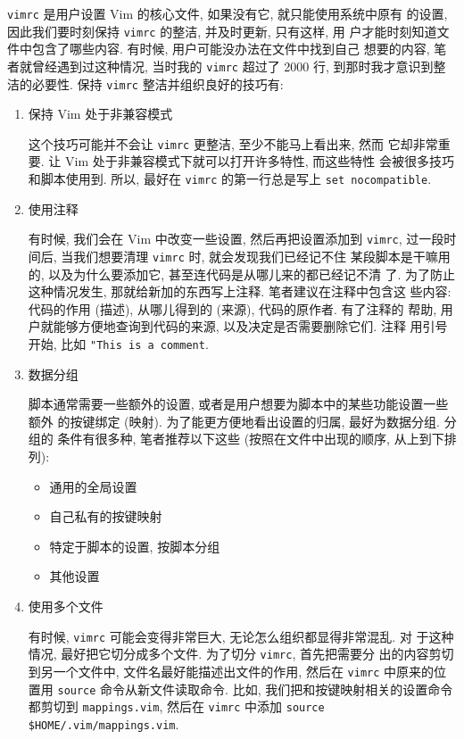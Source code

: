 \texttt{vimrc} 是用户设置 Vim 的核心文件, 如果没有它, 就只能使用系统中原有
的设置, 因此我们要时刻保持 \texttt{vimrc} 的整洁, 并及时更新, 只有这样, 用
户才能时刻知道文件中包含了哪些内容. 有时候, 用户可能没办法在文件中找到自己
想要的内容, 笔者就曾经遇到过这种情况, 当时我的 \texttt{vimrc} 超过了 2000 行,
到那时我才意识到整洁的必要性. 保持 \texttt{vimrc} 整洁并组织良好的技巧有:
\begin{enumerate}
	\item 保持 Vim 处于非兼容模式

	这个技巧可能并不会让 \texttt{vimrc} 更整洁, 至少不能马上看出来, 然而
	它却非常重要. 让 Vim 处于非兼容模式下就可以打开许多特性, 而这些特性
	会被很多技巧和脚本使用到. 所以, 最好在 \texttt{vimrc} 的第一行总是写上
	\texttt{set nocompatible}.
	
	\item 使用注释

	有时候, 我们会在 Vim 中改变一些设置, 然后再把设置添加到 \texttt{vimrc},
	过一段时间后, 当我们想要清理 \texttt{vimrc} 时, 就会发现我们已经记不住
	某段脚本是干嘛用的, 以及为什么要添加它, 甚至连代码是从哪儿来的都已经记不清
	了. 为了防止这种情况发生, 那就给新加的东西写上注释. 笔者建议在注释中包含这
	些内容: 代码的作用 (描述), 从哪儿得到的 (来源), 代码的原作者. 有了注释的
	帮助, 用户就能够方便地查询到代码的来源, 以及决定是否需要删除它们. 注释
	用引号开始, 比如 \texttt{"This is a comment}.

	\item 数据分组

	脚本通常需要一些额外的设置, 或者是用户想要为脚本中的某些功能设置一些额外
	的按键绑定 (映射). 为了能更方便地看出设置的归属, 最好为数据分组. 分组的
	条件有很多种, 笔者推荐以下这些 (按照在文件中出现的顺序, 从上到下排列):
	\begin{itemize}
	  \item 通用的全局设置
	  \item 自己私有的按键映射
	  \item 特定于脚本的设置, 按脚本分组
	  \item 其他设置
	\end{itemize}

	\item 使用多个文件
	
	有时候, \texttt{vimrc} 可能会变得非常巨大, 无论怎么组织都显得非常混乱. 对
	于这种情况, 最好把它切分成多个文件. 为了切分 \texttt{vimrc}, 首先把需要分
	出的内容剪切到另一个文件中, 文件名最好能描述出文件的作用, 然后在
	\texttt{vimrc} 中原来的位置用 \texttt{source} 命令从新文件读取命令.
	比如, 我们把和按键映射相关的设置命令都剪切到 \texttt{mappings.vim},
	然后在 \texttt{vimrc} 中添加 \texttt{source \$HOME/.vim/mappings.vim}.


\end{enumerate}
